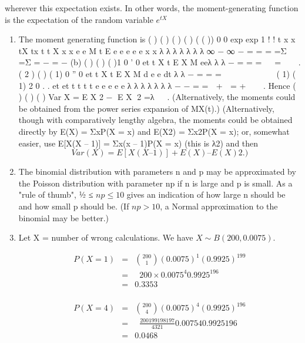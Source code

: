 \documentclass[a4paper,12pt]{article}
\begin{document}
wherever this expectation exists. In other words, the moment-generating function is the expectation of the random variable 
${\displaystyle e^{tX}} $
\begin{enumerate}
\item  The moment generating function is
( ) ( ) ( ) ( ) ( ( ))
0 0
exp exp 1
! !
t x x
tX tx t t
X
x x
e e M t E e e e e e
x x
λ
λ λ λ λ λ λ
∞ − ∞
−
= =
= =Σ =Σ = − = −
(b) ( ) ( ) ( )1
0
' 0
et t
X
t
E X M eeλ
λ λ −
=
= =   =  
.
( 2 ) ( ) ( 1)
0
'' 0
et t
X
t
E X M d e e
dt
λ λ −
=
= =         
( 1) ( 1) 2
0
. .
et et t t t
t
e e e e e λ λ λ λ λ λ λ − −
=
=  +  = +  
.
Hence ( ) ( ) ( ) Var X = E X 2 − E X 2 =λ   .
(Alternatively, the moments could be obtained from the power series
expansion of MX(t).)
(Alternatively, though with comparatively lengthy algebra, the
moments could be obtained directly by E(X) = ΣxP(X = x) and E(X2) =
Σx2P(X = x); or, somewhat easier, use E[X(X – 1)] = Σx(x – 1)P(X = x)
(this is λ2) and then 
\[Var(X) = E[X(X – 1)] + E(X) – {E(X)}2.)\]
\item  The binomial distribution with parameters n and p may be
approximated by the Poisson distribution with parameter np if n is
large and p is small. As a "rule of thumb", ½ ≤ $np \leq 10$ gives an
indication of how large n should be and how small p should be. (If
$np > 10$, a Normal approximation to the binomial may be better.)

\item  Let X = number of wrong calculations. We have $X \sim B(200, 0.0075)$.

\begin{eqnarray*}
P(X=1) &=& { 200 \choose 1}(0.0075)^1(0.9925)^{199} \\
&=&  200 \times  0.0075^4 0.9925^{196}\\
&=& 0.3353\\
\end{eqnarray*}

\begin{eqnarray*}
P(X=4) &=& { 200 \choose 4}(0.0075)^4(0.9925)^{196} \\
&=&  
\frac{200 199 198 197}{4 3 2 1} 0.00754 0.9925196\\
&=& 0.0468\\
\end{eqnarray*}

\begin{framed}
 

\end{framed}
\end{enumerate}
\end{document}
